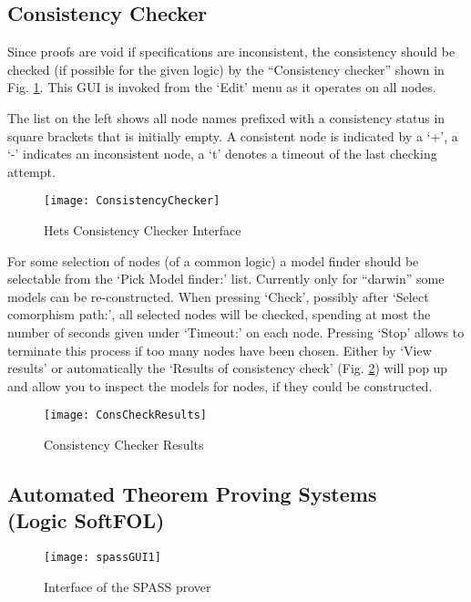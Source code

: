 \documentclass{article}
\newcommand{\normalTEXTSC}[2]{{#1\scriptsize#2}}
\newcommand     {\SPASS}{\normalTEXTSC{S}{PASS}\xspace}
\begin{document}
\subsection{Consistency Checker}
\label{sec:CC}
Since proofs are void if specifications are inconsistent, the consistency
should be checked (if possible for the given logic) by the ``Consistency
checker'' shown in Fig. \ref{fig:cons_window}.  This GUI is invoked from
the `Edit' menu as it operates on all nodes.

The list on the left shows all node names prefixed with a consistency status
in square brackets that is initially empty.  A consistent node is indicated by
a `+', a `-' indicates an inconsistent node, a `t' denotes a timeout of the last
checking attempt.

\begin{figure}
\centering
\texttt{[image: ConsistencyChecker]}
\caption{Hets Consistency Checker Interface\label{fig:cons_window}}
\end{figure}

For some selection of nodes (of a common logic) a model finder should be
selectable from the `Pick Model finder:' list. Currently only for ``darwin''
some \CASL models can be re-constructed. When pressing `Check', possibly after
`Select comorphism path:', all selected nodes will be checked, spending at
most the number of seconds given under `Timeout:' on each node. Pressing
`Stop' allows to terminate this process if too many nodes have been chosen.
Either by `View results' or automatically the `Results of consistency check'
(Fig. \ref{fig:cons_res}) will pop up and allow you to inspect the models for
nodes, if they could be constructed.

\begin{figure}
\centering
\texttt{[image: ConsCheckResults]}
\caption{Consistency Checker Results\label{fig:cons_res}}
\end{figure}

\subsection[Automated Theorem Proving Systems]
{Automated Theorem Proving Systems\\(Logic SoftFOL)}
\label{sec:ATP}

\begin{figure}
\centering
\texttt{[image: spassGUI1]}
\caption{Interface of the \SPASS prover\label{fig:SPASS_GUI}}
\end{figure}
\end{document}
